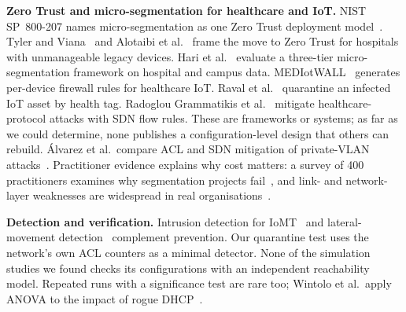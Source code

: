 \textbf{Zero Trust and micro-segmentation for healthcare and IoT.}
NIST SP~800-207 names micro-segmentation as one Zero Trust deployment model~\cite{nist80027}. Tyler and Viana~\cite{Tyler2021TrustNo} and Alotaibi et al.~\cite{Alotaibi2025HybridZeroTrustLegacy} frame the move to Zero Trust for hospitals with unmanageable legacy devices. Hari et al.~\cite{Hari2026ThreeTier} evaluate a three-tier micro-segmentation framework on hospital and campus data. MEDIotWALL~\cite{GosalvezWhite2025Mediotwall} generates per-device firewall rules for healthcare IoT. Raval et al.~\cite{Raval2026ImplementationDynamic} quarantine an infected IoT asset by health tag. Radoglou Grammatikis et al.~\cite{Grammatikis2021ModelingDetecting} mitigate healthcare-protocol attacks with SDN flow rules. These are frameworks or systems; as far as we could determine, none publishes a configuration-level design that others can rebuild. \'{A}lvarez et al.\ compare ACL and SDN mitigation of private-VLAN attacks~\cite{Alvarez2023PerformanceAnalysis}. Practitioner evidence explains why cost matters: a survey of 400 practitioners examines why segmentation projects fail~\cite{Dube2026WhyNetwork}, and link- and network-layer weaknesses are widespread in real organisations~\cite{Alvarez2026NetworkSecurity}.

\textbf{Detection and verification.}
Intrusion detection for IoMT~\cite{Thamilarasu2020IntrusionDetection} and lateral-movement detection~\cite{Smiliotopoulos2024DetectingLateral} complement prevention. Our quarantine test uses the network's own ACL counters as a minimal detector. None of the simulation studies we found checks its configurations with an independent reachability model. Repeated runs with a significance test are rare too; Wintolo et al.\ apply ANOVA to the impact of rogue DHCP~\cite{Wintolo2023DescriptiveAnalysis}.
